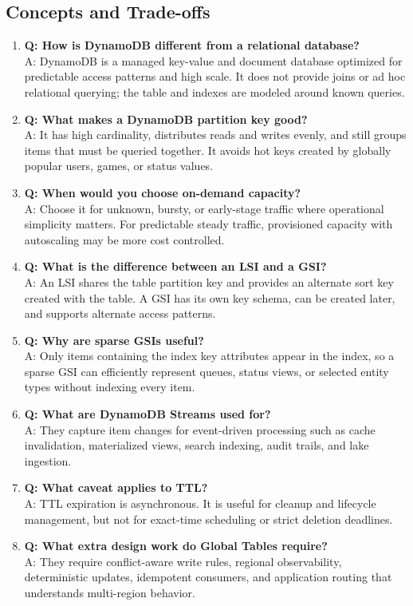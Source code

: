 \subsection{Concepts and Trade-offs}
\begin{enumerate}
    \item \textbf{Q: How is DynamoDB different from a relational database?}\\
    A: DynamoDB is a managed key-value and document database optimized for predictable access patterns and high scale. It does not provide joins or ad hoc relational querying; the table and indexes are modeled around known queries.
    \item \textbf{Q: What makes a DynamoDB partition key good?}\\
    A: It has high cardinality, distributes reads and writes evenly, and still groups items that must be queried together. It avoids hot keys created by globally popular users, games, or status values.
    \item \textbf{Q: When would you choose on-demand capacity?}\\
    A: Choose it for unknown, bursty, or early-stage traffic where operational simplicity matters. For predictable steady traffic, provisioned capacity with autoscaling may be more cost controlled.
    \item \textbf{Q: What is the difference between an LSI and a GSI?}\\
    A: An LSI shares the table partition key and provides an alternate sort key created with the table. A GSI has its own key schema, can be created later, and supports alternate access patterns.
    \item \textbf{Q: Why are sparse GSIs useful?}\\
    A: Only items containing the index key attributes appear in the index, so a sparse GSI can efficiently represent queues, status views, or selected entity types without indexing every item.
    \item \textbf{Q: What are DynamoDB Streams used for?}\\
    A: They capture item changes for event-driven processing such as cache invalidation, materialized views, search indexing, audit trails, and lake ingestion.
    \item \textbf{Q: What caveat applies to TTL?}\\
    A: TTL expiration is asynchronous. It is useful for cleanup and lifecycle management, but not for exact-time scheduling or strict deletion deadlines.
    \item \textbf{Q: What extra design work do Global Tables require?}\\
    A: They require conflict-aware write rules, regional observability, deterministic updates, idempotent consumers, and application routing that understands multi-region behavior.
\end{enumerate}

